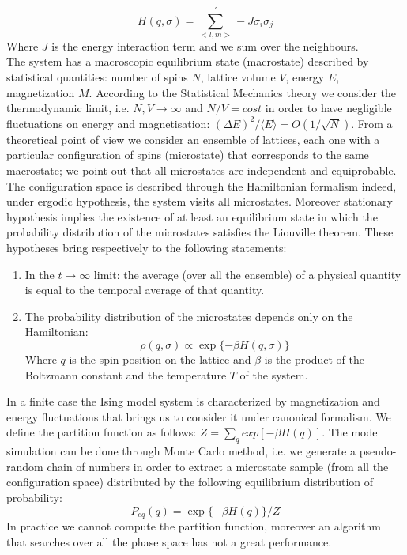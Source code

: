 \documentclass[11pt,a4paper]{article}
\begin{document}
\begin{equation}
  H(q, \sigma) = \sum_{<l,m>}^{'} -J\sigma_i\sigma_j
\end{equation}
Where $J$ is the energy interaction term and we sum over the neighbours.
\\
The system has  a macroscopic equilibrium state (macrostate) described by statistical quantities: number of spins $N$, lattice volume $V$, energy $E$, magnetization $M$. According to the Statistical Mechanics theory we consider the thermodynamic limit, i.e. $N, V \rightarrow \infty$ and $N/V = cost$ in order to have negligible fluctuations on energy and magnetisation: $(\Delta E)^2 / \langle E \rangle = O  (1/ \sqrt{N}) $.
From a theoretical point of view we consider an ensemble of lattices, each one with a particular configuration of spins (microstate) that corresponds to the same macrostate; we point out that all microstates are independent and equiprobable. The configuration space is described through the Hamiltonian formalism indeed, under ergodic hypothesis, the system visits all microstates. Moreover stationary hypothesis implies the existence of at least an equilibrium state in which  the probability distribution of the microstates satisfies the Liouville theorem. These hypotheses bring respectively to the following statements:

\begin{enumerate}
\item In the $t \rightarrow \infty$ limit: the average (over all the ensemble) of a physical quantity is equal to the temporal average of that quantity.
\item The probability distribution of the microstates depends only on the Hamiltonian:
  \begin{equation}
    \rho (q, \sigma ) \propto \exp \lbrace- \beta H(q, \sigma ) \rbrace
  \end{equation}
  Where $q$ is the spin position on the lattice and $\beta$ is the product of the Boltzmann constant and the temperature $T$ of the system.
\end{enumerate}
In a finite case the Ising model system is characterized by magnetization and  energy fluctuations that brings us to consider it under canonical formalism. We define the partition function as follows: $Z = \sum_q exp [  -\beta H(q) ]$. The model simulation can be done through Monte Carlo method, i.e. we generate a pseudo-random chain of numbers in order to extract a microstate sample (from all the configuration space) distributed by the following equilibrium distribution of probability:
\begin{equation}
  P_{eq}(q)=\exp \lbrace -\beta H(q)\rbrace /Z
\end{equation}
In practice we cannot compute the partition function, moreover an algorithm that searches over all the phase space has not a great performance.
\end{document}
